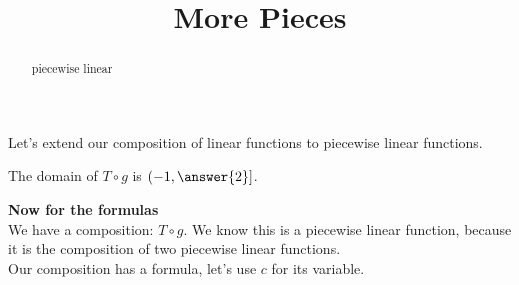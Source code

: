 \documentclass{ximera}
\title{More Pieces}
\begin{document}
\begin{abstract}
piecewise linear
\end{abstract}
\maketitle







Let's extend our composition of linear functions to piecewise linear functions.








The domain of $T \circ g$ is $\left( -1, \answer{2} \right]$.



\textbf{Now for the formulas} \\


We have a composition: $T \circ g$.  We know this is a piecewise linear function, because it is the composition of two piecewise linear functions. \\

Our composition has a formula, let's use $c$ for its variable. \\
\end{document}
